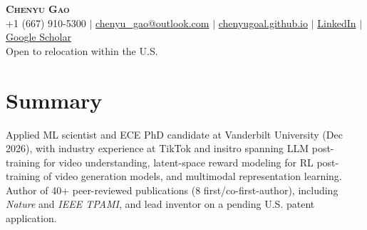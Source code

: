 \documentclass[letterpaper,11pt]{article}
\begin{document}
\begin{center}
    \textbf{\Huge \scshape Chenyu Gao} \\ \vspace{5pt}
    \small
    +1 (667) 910-5300 $|$
    \href{mailto:chenyu_gao@outlook.com}{chenyu\_gao@outlook.com} $|$
    \href{https://chenyugoal.github.io/}{chenyugoal.github.io} $|$
    \href{https://www.linkedin.com/in/chenyu-gao-4633b31a4/}{LinkedIn} $|$
    \href{https://scholar.google.com/citations?hl=en&user=rKHNyWoAAAAJ&view_op=list_works&sortby=pubdate}{Google Scholar} \\ \vspace{3pt}
    Open to relocation within the U.S.
\end{center}

\section{Summary}
\small{
    Applied ML scientist and ECE PhD candidate at Vanderbilt University (Dec 2026),
    with industry experience at TikTok and insitro spanning LLM post-training for video understanding,
    latent-space reward modeling for RL post-training of video generation models, and multimodal representation learning.
    Author of 40+ peer-reviewed publications (8 first/co-first-author), including \textit{Nature} and \textit{IEEE TPAMI},
    and lead inventor on a pending U.S. patent application.
}
\end{document}
